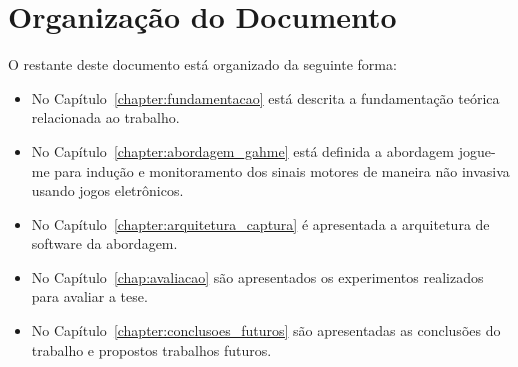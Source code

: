 %
%




\section{Organização do Documento}
O restante deste documento está organizado da seguinte forma:
\begin{itemize}
	\item No Capítulo~\ref{chapter:fundamentacao} está descrita a fundamentação teórica relacionada ao trabalho.
	\item No Capítulo~\ref{chapter:abordagem_gahme} está definida a abordagem \ac{jogue-me} para indução e monitoramento dos sinais motores de maneira não invasiva usando jogos eletrônicos.
	\item No Capítulo~\ref{chapter:arquitetura_captura} é apresentada a arquitetura de software da abordagem.
	\item No Capítulo~\ref{chap:avaliacao} são apresentados os experimentos realizados para avaliar a tese.
	\item No Capítulo~\ref{chapter:conclusoes_futuros} são apresentadas as conclusões do trabalho e propostos trabalhos futuros.
\end{itemize}
